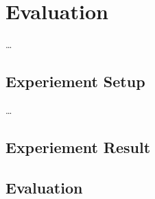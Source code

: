
\chapter{Evaluation}
\label{ch:Evaluation}

\dots


\section{Experiement Setup}
\label{ch:Evaluation:sec:ExperimentSetup}

\dots

\section{Experiement Result}
\label{ch:Evaluation:sec:ExperimentResult}

\section{Evaluation}
\label{ch:Evaluation:sec:Evaluation}
